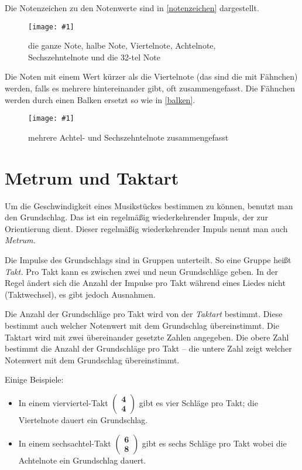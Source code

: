 \documentclass[10pt,a4paper,twoside]{report}
\newcommand{\comment}[1]{
	\marginpar{
		\textsf{#1}
	}
}
\newcommand{\image}[4]{
	\begin{figure}[!ht]
		\centering
		\texttt{[image: \#1]}
		\caption{#2}
		\label{#3}
	\end{figure}
}
\begin{document}
Die Notenzeichen zu den Notenwerte sind in \autoref{notenzeichen} dargestellt.%
\image{lilypond/notenwerte.png}{die ganze Note, halbe Note, Viertelnote,
Achtelnote, Sechszehntelnote und die 32-tel Note}{notenzeichen}{8}
Die Noten mit einem Wert kürzer als die Viertelnote (das sind die mit Fähnchen) 
werden, falls es mehrere hintereinander gibt, oft zusammengefasst. 
Die Fähnchen werden 
durch einen Balken ersetzt so wie in \autoref{balken}.
\image{lilypond/balken.png}{mehrere Achtel- und Sechszehntelnote zusammengefasst}{balken}{6.5}

\section{Metrum und Taktart}
Um die Geschwindigkeit eines Musikstückes bestimmen zu können, benutzt man
den Grundschlag. Das ist ein regelmäßig wiederkehrender Impuls, der zur
Orientierung dient. \comment{Metrum}Dieser regelmäßig 
wiederkehrender Impuls nennt man auch \emph{Metrum.}

Die Impulse des Grundschlags sind in Gruppen unterteilt. So eine Gruppe heißt 
\emph{Takt.}\comment{Takt}Pro Takt kann es zwischen zwei und neun
Grundschläge geben. 
In der Regel ändert sich die Anzahl der Impulse pro Takt während eines
Liedes nicht (Taktwechsel), es gibt jedoch Ausnahmen. 


Die Anzahl der Grundschläge pro Takt wird von der \emph{Taktart}
bestimmt.\comment{Taktart}Diese bestimmt auch welcher Notenwert
mit dem Grundschlag übereinstimmt. Die Taktart wird mit zwei 
übereinander gesetzte Zahlen angegeben. Die obere Zahl bestimmt die Anzahl
der Grundschläge pro Takt -- die untere Zahl zeigt welcher Notenwert mit dem
Grundschlag übereinstimmt.


Einige Beispiele:
\parskip 0pt
\begin{itemize}
\item In einem vierviertel-Takt $ \left( \begin{array}{c}\textbf{4} \\ \textbf{4} \end{array}\right)  $
gibt es vier Schläge pro Takt; die Viertelnote dauert ein Grundschlag.
\item In einem sechsachtel-Takt $ \left( \begin{array}{c}\textbf{6} \\ \textbf{8} \end{array}\right)  $
gibt es sechs Schläge pro Takt wobei die Achtelnote ein Grundschlag dauert.
\end{itemize}
\parskip 3pt
\end{document}

